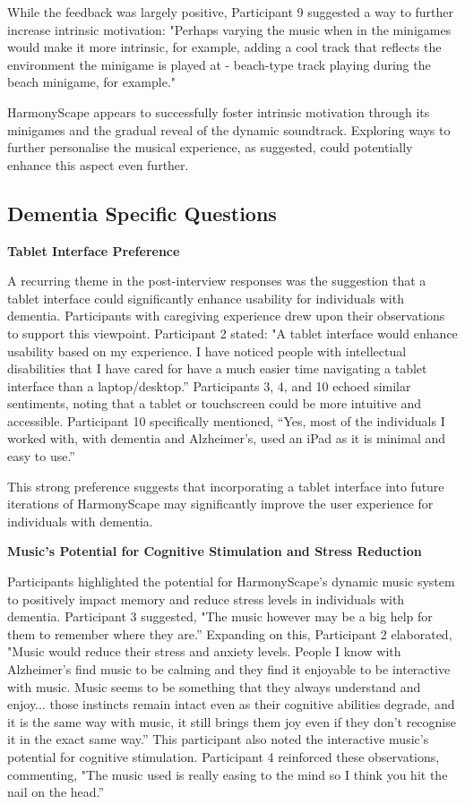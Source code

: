 \documentclass{l4proj}
\begin{document}
While the feedback was largely positive, Participant 9 suggested a way to further increase intrinsic motivation: "Perhaps varying the music when in the minigames would make it more intrinsic, for example, adding a cool track that reflects the environment the minigame is played at - beach-type track playing during the beach minigame, for example."

HarmonyScape appears to successfully foster intrinsic motivation through its  minigames and the gradual reveal of the dynamic soundtrack. Exploring ways to further personalise the musical experience, as suggested, could potentially enhance this aspect even further.


\subsection{Dementia Specific Questions}

\textbf{Tablet Interface Preference}

A recurring theme in the post-interview responses was the suggestion that a tablet interface could significantly enhance usability for individuals with dementia. Participants with caregiving experience drew upon their observations to support this viewpoint. Participant 2 stated: "A tablet interface would enhance usability based on my experience. I have noticed people with intellectual disabilities that I have cared for have a much easier time navigating a tablet interface than a laptop/desktop.” Participants 3, 4, and 10 echoed similar sentiments, noting that a tablet or touchscreen could be more intuitive and accessible. Participant 10 specifically mentioned, “Yes, most of the individuals I worked with, with dementia and Alzheimer's, used an iPad as it is minimal and easy to use.” 

This strong preference suggests that incorporating a tablet interface into future iterations of HarmonyScape may significantly improve the user experience for individuals with dementia.
\newline

\textbf{Music's Potential for Cognitive Stimulation and Stress Reduction}

Participants highlighted the potential for HarmonyScape's dynamic music system to positively impact memory and reduce stress levels in individuals with dementia.  Participant 3 suggested, "The music however may be a big help for them to remember where they are.” Expanding on this, Participant 2 elaborated, "Music would reduce their stress and anxiety levels. People I know with Alzheimer's find music to be calming and they find it enjoyable to be interactive with music. Music seems to be something that they always understand and enjoy... those instincts remain intact even as their cognitive abilities degrade, and it is the same way with music, it still brings them joy even if they don't recognise it in the exact same way.” This participant also noted the interactive music's potential for cognitive stimulation. Participant 4 reinforced these observations, commenting, "The music used is really easing to the mind so I think you hit the nail on the head.” 
\end{document}
